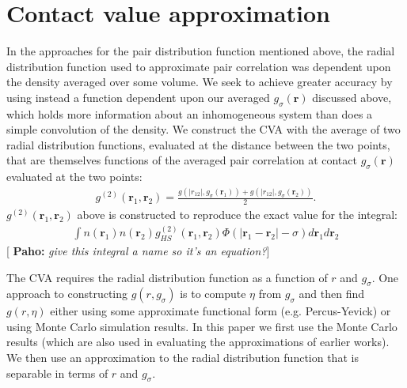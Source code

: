 \documentclass[letterpaper,twocolumn,amsmath,amssymb,pre,aps,10pt]{revtex4-1}
\newcommand{\green}[1]{{\bf \color{green} #1}}
\newcommand{\rr}{\textbf{r}}
\newcommand{\pahosays}[1]{{\color{red} [\green{Paho:} \emph{#1}]}}
\begin{document}
\section{Contact value approximation}
In the approaches for the pair distribution function mentioned above,
the radial distribution function used to approximate pair correlation
was dependent upon the density averaged over some volume.  We seek to
achieve greater accuracy by using instead a function dependent upon
our averaged $g_{\sigma}(\rr)$ discussed above, which holds more
information about an inhomogeneous system than does a simple
convolution of the density.
%
We construct the CVA with the average of two radial distribution
functions, evaluated at the distance between the two points, that are
themselves functions of the averaged pair correlation at contact
$g_{\sigma}(\rr)$ evaluated at the two points:
%
\begin{align}
  g^{(2)}(\rr_1,\rr_2) = \frac{g(|r_{12}|, g_\sigma(\rr_1)) +
    g(|r_{12}|, g_\sigma(\rr_2))}{2}. \label{eq:g2-our-mean}
\end{align}
$g^{(2)}(\rr_1,\rr_2)$ above is constructed to reproduce the exact
value for the integral:
\begin{align}
  \label{eq:1}
  \int n(\rr_1)n(\rr_2)g_{HS}^{(2)}(\rr_1,\rr_2)\Phi(|\rr_1 -
  \rr_2|-\sigma)d\rr_1d\rr_2
\end{align}
\pahosays{give this integral a name so it's an equation?}
\par
The CVA requires the radial distribution function as a function of $r$
and $g_\sigma$.  One approach to constructing $g(r,g_\sigma)$ is to
compute $\eta$ from $g_\sigma$ and then find $g(r,\eta)$ either using
some approximate functional form (e.g. Percus-Yevick) or using Monte
Carlo simulation results.  In this paper we first use the Monte Carlo
results (which are also used in evaluating the approximations of
earlier works). We then use an approximation to the radial
distribution function that is separable in terms of $r$ and
$g_\sigma$.
\end{document}
